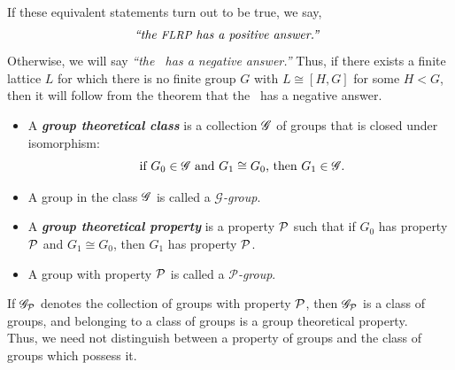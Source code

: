\documentclass[xcolor=dvipsnames,11pt,hide notes]{beamer}
\newcommand{\defn}[1]{\textcolor{olivegreen}{\textit{\textbf{#1}}}}
\theoremstyle{definition}
\theoremstyle{remark}
\numberwithin{theorem}{section}
\numberwithin{claim}{section}
\numberwithin{equation}{section}
\numberwithin{conjecture}{section}
\begin{document}
\begin{frame}[fragile,label=LocalStructureNegAnswer]{}
If these equivalent statements turn out to be true, we say,
\[\text{\emph{``the {\small FLRP}\ has a positive answer.''}  }\]
Otherwise, we will say 
\emph{``the \FLRP\ has a negative answer.''} 
\vskip4mm Thus, if there exists a finite lattice $L$ for which 
there is no finite group $G$ with $L \cong [H,G]$ for some $H< G$,
then it will follow from the theorem that the \FLRP\ has a negative answer.
\end{frame}








\begin{frame}[label=ClassProp]{}
  \begin{itemize}
  \item  A \defn{group theoretical class} is a
    collection $\mathscr{G}$ of groups that is closed under isomorphism:
    \[
    \text{ if $G_0\in \mathscr{G}$ and  $G_1\cong G_0$, then $G_1\in \mathscr{G}$.}
    \]
\vskip5pt
\item[] A group in the class $\mathscr{G}$ is called a \emph{$\mathscr{G}$-group}.
  \vskip14mm
  \item A \defn{group theoretical property}
    is a property $\mathcal{P}$ such that if $G_0$ has property $\mathcal{P}$ and
    $G_1\cong G_0$, then $G_1$ has property $\mathcal{P}$.
\vskip5pt
\item[] A group with property $\mathcal{P}$ is called a \emph{$\mathcal{P}$-group}.  
  \end{itemize}
\end{frame}

\begin{frame}[label=ClassProp]{}
If $\mathscr{G}_{\mathcal{P}}$ denotes the collection of groups with property $\mathcal{P}$, then
  $\mathscr{G}_{\mathcal{P}}$  is a class of groups, and belonging to a class of groups is a
  group theoretical property. \\[6pt]
Thus, we need not distinguish between a property of groups and the
  class of groups which possess it.
\vskip2cm
\end{frame}
\end{document}
